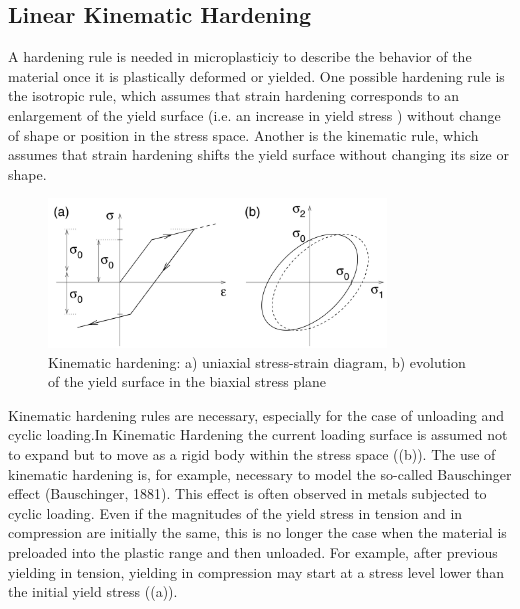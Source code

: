 \subsection{Linear Kinematic Hardening}
A hardening rule is needed in microplasticiy to
describe the behavior of the
material once it is plastically
deformed or yielded. One possible hardening rule is the
isotropic rule, which assumes
that strain hardening corresponds
to an enlargement of the yield
surface (i.e. an increase in  yield stress )
without change of shape or
position in the stress space. Another is the kinematic rule,
which assumes that strain
hardening shifts the yield surface
without changing its size or shape.
\begin{figure}[h!]
	\centering
	\includegraphics[width=0.8\textwidth]{figures//kinhard.png} 
	\caption{Kinematic hardening: a) uniaxial stress-strain diagram, b) evolution of the
		yield surface in the biaxial stress plane}
	\label{kinhard}
\end{figure}
Kinematic hardening rules are necessary, especially for the case of unloading and cyclic loading.In Kinematic Hardening the current loading surface is assumed not to expand but to move as a rigid body within the stress space ((b)). The use
of kinematic hardening is, for example, necessary to model the so-called Bauschinger
effect (Bauschinger, 1881). This effect is often observed in metals subjected to cyclic
loading. Even if the magnitudes of the yield stress in tension and in compression
are initially the same, this is no longer the case when the material is preloaded into
the plastic range and then unloaded. For example, after previous yielding in tension,
yielding in compression may start at a stress level lower than the initial yield stress
((a)).

